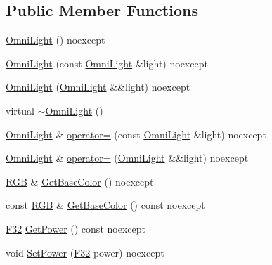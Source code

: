 \subsection*{Public Member Functions}
\begin{DoxyCompactItemize}
\item 
\mbox{\hyperlink{classmage_1_1rendering_1_1_omni_light_a641472ade99dc84b6e82e3d01d8b574a}{Omni\+Light}} () noexcept
\item 
\mbox{\hyperlink{classmage_1_1rendering_1_1_omni_light_adc27e555c730dbe8891e6ac4eb9d3900}{Omni\+Light}} (const \mbox{\hyperlink{classmage_1_1rendering_1_1_omni_light}{Omni\+Light}} \&light) noexcept
\item 
\mbox{\hyperlink{classmage_1_1rendering_1_1_omni_light_a235afcf044e62a3f6672316eb8f3cd99}{Omni\+Light}} (\mbox{\hyperlink{classmage_1_1rendering_1_1_omni_light}{Omni\+Light}} \&\&light) noexcept
\item 
virtual \mbox{\hyperlink{classmage_1_1rendering_1_1_omni_light_af0981e056620d3f0df827098448c8052}{$\sim$\+Omni\+Light}} ()
\item 
\mbox{\hyperlink{classmage_1_1rendering_1_1_omni_light}{Omni\+Light}} \& \mbox{\hyperlink{classmage_1_1rendering_1_1_omni_light_aac914061f6798131e7f59275b4716b48}{operator=}} (const \mbox{\hyperlink{classmage_1_1rendering_1_1_omni_light}{Omni\+Light}} \&light) noexcept
\item 
\mbox{\hyperlink{classmage_1_1rendering_1_1_omni_light}{Omni\+Light}} \& \mbox{\hyperlink{classmage_1_1rendering_1_1_omni_light_a8126d5d0d3a45d0063c3fd2f28e3826e}{operator=}} (\mbox{\hyperlink{classmage_1_1rendering_1_1_omni_light}{Omni\+Light}} \&\&light) noexcept
\item 
\mbox{\hyperlink{structmage_1_1_r_g_b}{R\+GB}} \& \mbox{\hyperlink{classmage_1_1rendering_1_1_omni_light_a408bde4df7fd40750cb0e4dd4d2f6d1a}{Get\+Base\+Color}} () noexcept
\item 
const \mbox{\hyperlink{structmage_1_1_r_g_b}{R\+GB}} \& \mbox{\hyperlink{classmage_1_1rendering_1_1_omni_light_a6c68ed32167890c1b0f01130c610c3e2}{Get\+Base\+Color}} () const noexcept
\item 
\mbox{\hyperlink{namespacemage_aa97e833b45f06d60a0a9c4fc22ae02c0}{F32}} \mbox{\hyperlink{classmage_1_1rendering_1_1_omni_light_a43c6be5649668705ffb1ace363960b00}{Get\+Power}} () const noexcept
\item 
void \mbox{\hyperlink{classmage_1_1rendering_1_1_omni_light_a1887bf9c7f732188814b34f686638443}{Set\+Power}} (\mbox{\hyperlink{namespacemage_aa97e833b45f06d60a0a9c4fc22ae02c0}{F32}} power) noexcept

\end{DoxyCompactItemize}
